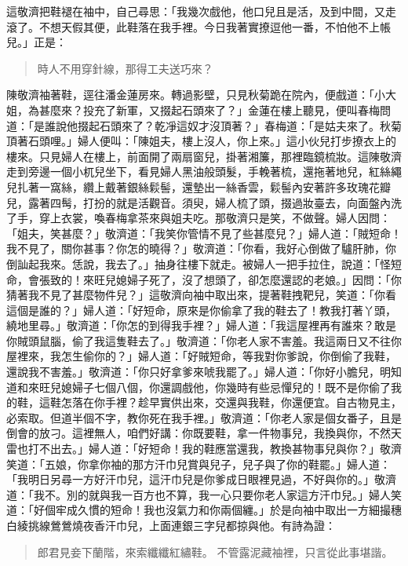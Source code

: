 這敬濟把鞋褪在袖中，自己尋思：「我幾次戲他，他口兒且是活，及到中間，又走滾了。不想天假其便，此鞋落在我手裡。今日我著實撩逗他一番，不怕他不上帳兒。」正是：
\begin{quote}
時人不用穿針線，那得工夫送巧來？
\end{quote}

陳敬濟袖著鞋，逕往潘金蓮房來。轉過影壁，只見秋菊跪在院內，便戲道：「小大姐，為甚麼來？投充了新軍，又掇起石頭來了？」金蓮在樓上聽見，便叫春梅問道：「是誰說他掇起石頭來了？乾凈這奴才沒頂著？」春梅道：「是姑夫來了。秋菊頂著石頭哩。」婦人便叫：「陳姐夫，樓上沒人，你上來。」這小伙兒打步撩衣上的樓來。只見婦人在樓上，前面開了兩扇窗兒，掛著湘簾，那裡臨鏡梳妝。這陳敬濟走到旁邊一個小杌兒坐下，看見婦人黑油般頭髮，手輓著梳，還拖著地兒，紅絲繩兒扎著一窩絲，纘上戴著銀絲鬏髻，還墊出一絲香雲，鬏髻內安著許多玫瑰花瓣兒，露著四髩，打扮的就是活觀音。須臾，婦人梳了頭，掇過妝臺去，向面盤內洗了手，穿上衣裳，喚春梅拿茶來與姐夫吃。那敬濟只是笑，不做聲。婦人因問：「姐夫，笑甚麼？」敬濟道：「我笑你管情不見了些甚麼兒？」婦人道：「賊短命！我不見了，關你甚事？你怎的曉得？」敬濟道：「你看，我好心倒做了驢肝肺，你倒訕起我來。恁說，我去了。」抽身往樓下就走。被婦人一把手拉住，說道：「怪短命，會張致的！來旺兒媳婦子死了，沒了想頭了，卻怎麼還認的老娘。」因問：「你猜著我不見了甚麼物件兒？」這敬濟向袖中取出來，提著鞋拽靶兒，笑道：「你看這個是誰的？」婦人道：「好短命，原來是你偷拿了我的鞋去了！教我打著丫頭，繞地里尋。」敬濟道：「你怎的到得我手裡？」婦人道：「我這屋裡再有誰來？敢是你賊頭鼠腦，偷了我這隻鞋去了。」敬濟道：「你老人家不害羞。我這兩日又不往你屋裡來，我怎生偷你的？」婦人道：「好賊短命，等我對你爹說，你倒偷了我鞋，還說我不害羞。」敬濟道：「你只好拿爹來唬我罷了。」婦人道：「你好小膽兒，明知道和來旺兒媳婦子七個八個，你還調戲他，你幾時有些忌憚兒的！既不是你偷了我的鞋，這鞋怎落在你手裡？趁早實供出來，交還與我鞋，你還便宜。自古物見主，必索取。但道半個不字，教你死在我手裡。」敬濟道：「你老人家是個女番子，且是倒會的放刁。這裡無人，咱們好講：你既要鞋，拿一件物事兒，我換與你，不然天雷也打不出去。」婦人道：「好短命！我的鞋應當還我，教換甚物事兒與你？」敬濟笑道：「五娘，你拿你袖的那方汗巾兒賞與兒子，兒子與了你的鞋罷。」婦人道：「我明日另尋一方好汗巾兒，這汗巾兒是你爹成日眼裡見過，不好與你的。」敬濟道：「我不。別的就與我一百方也不算，我一心只要你老人家這方汗巾兒。」婦人笑道：「好個牢成久慣的短命！我也沒氣力和你兩個纏。」於是向袖中取出一方細撮穗白綾挑線鶯鶯燒夜香汗巾兒，上面連銀三字兒都掠與他。有詩為證：
\begin{quote}
郎君見妾下蘭階，來索纖纖紅繡鞋。
不管露泥藏袖裡，只言從此事堪諧。
\end{quote}

